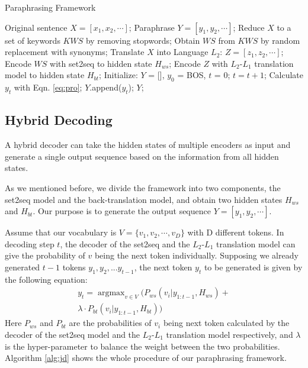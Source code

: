 \begin{algorithm}[t]
\caption{Paraphrasing Framework} 
\label{alg:jd}
\begin{algorithmic}[1]
\REQUIRE Original sentence $X = [x_1, x_2, \cdots]$;
\ENSURE Paraphrase $Y = [y_1, y_2, \cdots]$;
\STATE Reduce $X$ to a set of keywords $KWS$ by removing stopwords;
\STATE Obtain $WS$ from $KWS$ by random replacement with synonyms;
\STATE Translate $X$ into Language $L_2$: $Z = [z_1,z_2,\cdots]$;
\STATE Encode $WS$ with set2seq to hidden state $H_{ws}$;
\STATE Encode $Z$ with $L_2$-$L_1$ translation model to hidden state $H_{bt}$;
\STATE Initialize: $Y$ = [], $y_0$ = BOS, $t$ = 0;
\STATE $t = t + 1$;
\STATE Calculate $y_t$ with Eqn. \ref{eq:pro};
\STATE $Y$.append($y_t$);
\ENDWHILE
\RETURN $Y$;
\end{algorithmic}
\end{algorithm}


\subsection{Hybrid Decoding}\label{sec:joint}
A hybrid decoder can take the hidden states of multiple encoders as input and generate a single output sequence based on the information from all hidden states.

As we mentioned before, we divide the framework into two components, the set2seq model and the back-translation model, and obtain two hidden states $H_{ws}$ and $H_{bt}$. Our purpose is to generate the output sequence $Y = [y_1, y_2, \cdots]$.

Assume that our vocabulary is $V = \{v_1, v_2, \cdots, v_D\}$ with D different tokens. In decoding step $t$, the decoder of the set2seq and the $L_2$-$L_1$ translation model can give the probability of $v$ being the next token individually. Supposing we already generated $t-1$ tokens $y_1, y_2, ... y_{t-1}$, the next token $y_t$ to be generated is given by the following equation:
\begin{multline}
y_t = \mathop{\arg\max}_{v \in V} \big( P_{ws}\left( v_i|y_{1:t-1},H_{ws} \right) + \\
\lambda \cdot P_{bt}\left( v_i|y_{1:t-1},H_{bt}\right) \big)
\label{eq:pro}
\end{multline}
Here $P_{ws}$ and $P_{bt}$ are the probabilities of $v_i$ being next token calculated by the decoder of the set2seq model and the $L_2$-$L_1$ translation model respectively, and $\lambda$ is the hyper-parameter to balance the weight between the two probabilities. 
Algorithm \ref{alg:jd} shows the whole procedure of our paraphrasing framework.


